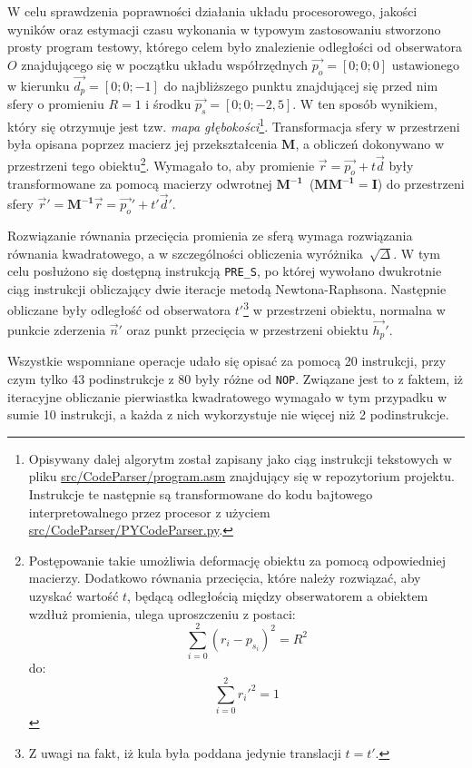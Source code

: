 W celu sprawdzenia poprawności działania układu procesorowego, jakości wyników oraz estymacji czasu wykonania w typowym zastosowaniu stworzono prosty program testowy, którego celem było znalezienie odległości od obserwatora $O$ znajdującego się w początku układu współrzędnych $\vec{p_o} = [0; 0; 0]$ ustawionego w kierunku $\vec{d_p} = [0; 0; -1]$ do najbliższego punktu znajdującej się przed nim sfery o promieniu $R = 1$ i środku $\vec{p_s} = [0; 0; -2,5]$. W ten sposób wynikiem, który się otrzymuje jest tzw. \textit{mapa głębokości}\footnote{Opisywany dalej algorytm został zapisany jako ciąg instrukcji tekstowych w pliku \url{src/CodeParser/program.asm} znajdujący się w repozytorium projektu. Instrukcje te następnie są transformowane do kodu bajtowego interpretowalnego przez procesor z użyciem \url{src/CodeParser/PYCodeParser.py}.}. Transformacja sfery w przestrzeni była opisana poprzez macierz jej przekształcenia $\mathbf{M}$, a obliczeń dokonywano w przestrzeni tego obiektu\footnote{Postępowanie takie umożliwia deformację obiektu za pomocą odpowiedniej macierzy. Dodatkowo równania przecięcia, które należy rozwiązać, aby uzyskać wartość $t$, będącą odległością między obserwatorem a obiektem wzdłuż promienia, ulega uproszczeniu z postaci:
\begin{equation*}
\sum_{i=0}^2\left(r_i - p_{s_i} \right)^2 = R^2
\end{equation*}
do:
\begin{equation*}
\sum_{i=0}^2 r_i'^2 = 1
\end{equation*}

}. Wymagało to, aby promienie $\vec{r} = \vec{p_o} + t\vec{d}$ były transformowane za pomocą macierzy odwrotnej $\mathbf{M^{-1}}$~($\mathbf{MM^{-1} = I}$) do przestrzeni sfery $\vec{r}' = \mathbf{M^{-1}}\vec{r} = \vec{p_o}' + t'\vec{d}'$. 

Rozwiązanie równania przecięcia promienia ze sferą wymaga rozwiązania równania kwadratowego, a w szczególności obliczenia wyróżnika~$\sqrt{\Delta}$. W tym celu posłużono się  dostępną instrukcją \texttt{PRE\_S}, po której wywołano dwukrotnie ciąg instrukcji obliczający dwie iteracje metodą Newtona-Raphsona. Następnie obliczane były odległość od obserwatora $t'$\footnote{Z uwagi na fakt, iż kula była poddana jedynie translacji $t = t'$.} w przestrzeni obiektu, normalna w punkcie zderzenia $\vec{n}'$ oraz punkt przecięcia w przestrzeni obiektu $\vec{h_p}'$.

Wszystkie wspomniane operacje udało się opisać za pomocą 20 instrukcji, przy czym tylko 43 podinstrukcje z 80 były różne od \texttt{NOP}. Związane jest to z faktem, iż iteracyjne obliczanie pierwiastka kwadratowego wymagało w tym przypadku w sumie 10 instrukcji, a każda z nich wykorzystuje nie więcej niż 2 podinstrukcje. 

